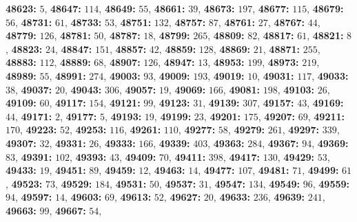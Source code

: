\textsf{\bfseries 48623:} $5$, \textsf{\bfseries 48647:} $114$, \textsf{\bfseries 48649:} $55$, \textsf{\bfseries 48661:} $39$, \textsf{\bfseries 48673:} $197$, \textsf{\bfseries 48677:} $115$, \textsf{\bfseries 48679:} $56$, \textsf{\bfseries 48731:} $61$, \textsf{\bfseries 48733:} $53$, \textsf{\bfseries 48751:} $132$, \textsf{\bfseries 48757:} $87$, \textsf{\bfseries 48761:} $27$, \textsf{\bfseries 48767:} $44$, \textsf{\bfseries 48779:} $126$, \textsf{\bfseries 48781:} $50$, \textsf{\bfseries 48787:} $18$, \textsf{\bfseries 48799:} $265$, \textsf{\bfseries 48809:} $82$, \textsf{\bfseries 48817:} $61$, \textsf{\bfseries 48821:} $8$, \textsf{\bfseries 48823:} $24$, \textsf{\bfseries 48847:} $151$, \textsf{\bfseries 48857:} $42$, \textsf{\bfseries 48859:} $128$, \textsf{\bfseries 48869:} $21$, \textsf{\bfseries 48871:} $255$, \textsf{\bfseries 48883:} $112$, \textsf{\bfseries 48889:} $68$, \textsf{\bfseries 48907:} $126$, \textsf{\bfseries 48947:} $13$, \textsf{\bfseries 48953:} $199$, \textsf{\bfseries 48973:} $219$, \textsf{\bfseries 48989:} $55$, \textsf{\bfseries 48991:} $274$, \textsf{\bfseries 49003:} $93$, \textsf{\bfseries 49009:} $193$, \textsf{\bfseries 49019:} $10$, \textsf{\bfseries 49031:} $117$, \textsf{\bfseries 49033:} $38$, \textsf{\bfseries 49037:} $20$, \textsf{\bfseries 49043:} $306$, \textsf{\bfseries 49057:} $19$, \textsf{\bfseries 49069:} $166$, \textsf{\bfseries 49081:} $198$, \textsf{\bfseries 49103:} $26$, \textsf{\bfseries 49109:} $60$, \textsf{\bfseries 49117:} $154$, \textsf{\bfseries 49121:} $99$, \textsf{\bfseries 49123:} $31$, \textsf{\bfseries 49139:} $307$, \textsf{\bfseries 49157:} $43$, \textsf{\bfseries 49169:} $44$, \textsf{\bfseries 49171:} $2$, \textsf{\bfseries 49177:} $5$, \textsf{\bfseries 49193:} $19$, \textsf{\bfseries 49199:} $23$, \textsf{\bfseries 49201:} $175$, \textsf{\bfseries 49207:} $69$, \textsf{\bfseries 49211:} $170$, \textsf{\bfseries 49223:} $52$, \textsf{\bfseries 49253:} $116$, \textsf{\bfseries 49261:} $110$, \textsf{\bfseries 49277:} $58$, \textsf{\bfseries 49279:} $261$, \textsf{\bfseries 49297:} $339$, \textsf{\bfseries 49307:} $32$, \textsf{\bfseries 49331:} $26$, \textsf{\bfseries 49333:} $166$, \textsf{\bfseries 49339:} $403$, \textsf{\bfseries 49363:} $284$, \textsf{\bfseries 49367:} $94$, \textsf{\bfseries 49369:} $83$, \textsf{\bfseries 49391:} $102$, \textsf{\bfseries 49393:} $43$, \textsf{\bfseries 49409:} $70$, \textsf{\bfseries 49411:} $398$, \textsf{\bfseries 49417:} $130$, \textsf{\bfseries 49429:} $53$, \textsf{\bfseries 49433:} $19$, \textsf{\bfseries 49451:} $89$, \textsf{\bfseries 49459:} $12$, \textsf{\bfseries 49463:} $14$, \textsf{\bfseries 49477:} $107$, \textsf{\bfseries 49481:} $71$, \textsf{\bfseries 49499:} $61$, \textsf{\bfseries 49523:} $73$, \textsf{\bfseries 49529:} $184$, \textsf{\bfseries 49531:} $50$, \textsf{\bfseries 49537:} $31$, \textsf{\bfseries 49547:} $134$, \textsf{\bfseries 49549:} $96$, \textsf{\bfseries 49559:} $94$, \textsf{\bfseries 49597:} $14$, \textsf{\bfseries 49603:} $69$, \textsf{\bfseries 49613:} $52$, \textsf{\bfseries 49627:} $20$, \textsf{\bfseries 49633:} $236$, \textsf{\bfseries 49639:} $241$, \textsf{\bfseries 49663:} $99$, \textsf{\bfseries 49667:} $54$, 
